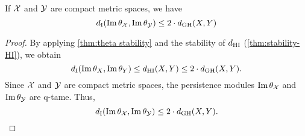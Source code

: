 \subsubsection{}\label{cor:theta stability VR}
\corollary If $\mathcal{X}$ and $\mathcal{Y}$ are compact metric spaces, we have
\[
d_{\mathrm{I}}(\operatorname{Im}\theta_{\mathcal{X}}, \operatorname{Im}\theta_{\mathcal{Y}}) \leq 2 \cdot d_{\mathrm{GH}}(X,Y)
\]

\begin{proof}
        By applying \cref{thm:theta stability} and the stability of $d_{\mathrm{HI}}$ (\cref{thm:stability-HI}), we obtain
        \[
        d_{\mathrm{I}}(\operatorname{Im}\theta_{X}, \operatorname{Im}\theta_{Y}) \leq
        d_{\mathrm{HI}}(X,Y) \leq 2\cdot d_{\mathrm{GH}}(X,Y).
        \]
        Since $\mathcal{X}$ and $\mathcal{Y}$ are compact metric spaces, the persistence modules $\operatorname{Im}\theta_{\mathcal{X}}$ and $\operatorname{Im}\theta_{\mathcal{Y}}$ are q-tame.
        Thus,
        \[
        d_{\mathrm{I}}(\operatorname{Im}\theta_{\mathcal{X}}, \operatorname{Im}\theta_{\mathcal{Y}}) \leq 2 \cdot d_{\mathrm{GH}}(X,Y). \qedhere
        \]
\end{proof}